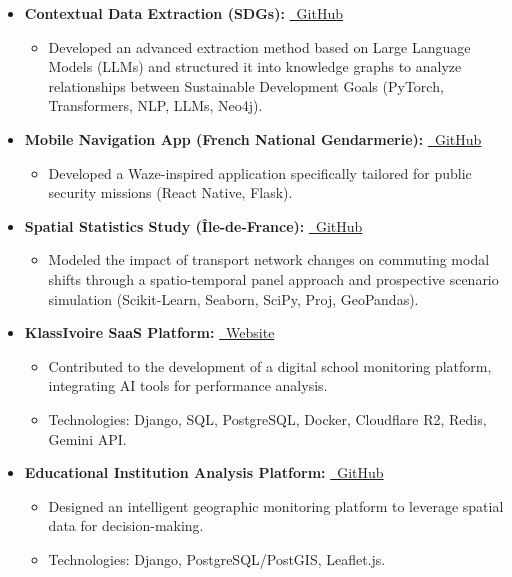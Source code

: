 \documentclass[11pt, a4paper]{article}
\begin{document}
\begin{itemize}[leftmargin=0.5cm, nosep]
    \item \textbf{Contextual Data Extraction (SDGs):} \href{https://github.com/MarcelAssie/PIR18}{\faGithub~GitHub}
    \begin{itemize}[leftmargin=0.5cm, nosep]
        \item Developed an advanced extraction method based on Large Language Models (LLMs) and structured it into knowledge graphs to analyze relationships between Sustainable Development Goals (PyTorch, Transformers, NLP, LLMs, Neo4j).
    \end{itemize}
    \vspace{0.2cm}
    \item \textbf{Mobile Navigation App (French National Gendarmerie):} \href{https://github.com/WYBG/PDI-APP-Nav-WAZE}{\faGithub~GitHub}
    \begin{itemize}[leftmargin=0.5cm, nosep]
        \item Developed a Waze-inspired application specifically tailored for public security missions (React Native, Flask).
    \end{itemize}
    \vspace{0.2cm}
    \item \textbf{Spatial Statistics Study (Île-de-France):} \href{https://github.com/MarcelAssie/SpatialAnalysisProject}{\faGithub~GitHub}
    \begin{itemize}[leftmargin=0.5cm, nosep]
        \item Modeled the impact of transport network changes on commuting modal shifts through a spatio-temporal panel approach and prospective scenario simulation (Scikit-Learn, Seaborn, SciPy, Proj, GeoPandas).
    \end{itemize}
    \vspace{0.2cm}
    \item \textbf{KlassIvoire SaaS Platform:} \href{https://klassivoire.kaedys.com/}{\faGlobe~Website}
    \begin{itemize}[leftmargin=0.5cm, nosep]
        \item Contributed to the development of a digital school monitoring platform, integrating AI tools for performance analysis.
        \item Technologies: Django, SQL, PostgreSQL, Docker, Cloudflare R2, Redis, Gemini API.
    \end{itemize}
    \vspace{0.2cm}
    \item \textbf{Educational Institution Analysis Platform:} \href{https://github.com/MarcelAssie/SIGWEB}{\faGithub~GitHub}
    \begin{itemize}[leftmargin=0.5cm, nosep]
        \item Designed an intelligent geographic monitoring platform to leverage spatial data for decision-making.
        \item Technologies: Django, PostgreSQL/PostGIS, Leaflet.js.
    \end{itemize}
\end{itemize}
\end{document}
